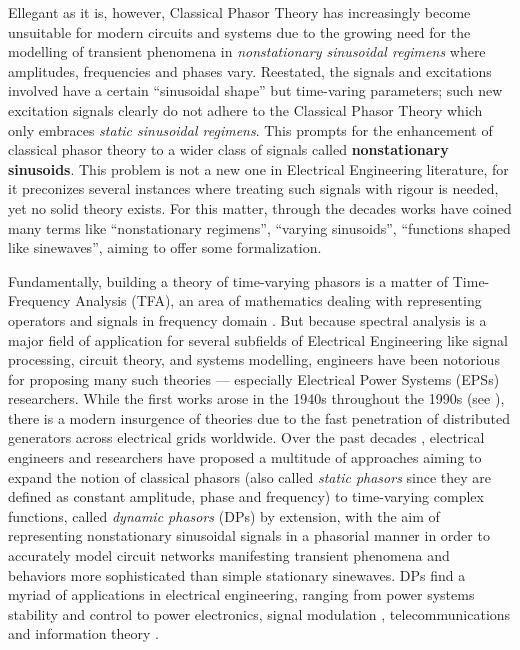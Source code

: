 	Ellegant as it is, however, Classical Phasor Theory has increasingly become unsuitable for modern circuits and systems due to the growing need for the modelling of transient phenomena in \textit{nonstationary sinusoidal regimens} where amplitudes, frequencies and phases vary. Reestated, the signals and excitations involved have a certain ``sinusoidal shape'' but time-varing parameters; such new excitation signals clearly do not adhere to the Classical Phasor Theory which only embraces \textit{static sinusoidal regimens}. This prompts for the enhancement of classical phasor theory to a wider class of signals called \textbf{nonstationary sinusoids}. This problem is not a new one in Electrical Engineering literature, for it preconizes several instances where treating such signals with rigour is needed, yet no solid theory exists. For this matter, through the decades works have coined many terms like ``nonstationary regimens'', ``varying sinusoids'', ``functions shaped like sinewaves'', aiming to offer some formalization.

	Fundamentally, building a theory of time-varying phasors is a matter of Time-Frequency Analysis (TFA), an area of mathematics dealing with representing operators and signals in frequency domain . But because spectral analysis is a major field of application for several subfields of Electrical Engineering like signal processing, circuit theory, and systems modelling, engineers have been notorious for proposing many such theories — especially Electrical Power Systems (EPSs) researchers. While the first works arose in the 1940s throughout the 1990s (see \cite{Venkatasubramanian1995a,Venkatasubramanian1995}), there is a modern insurgence of theories due to the fast penetration of distributed generators across electrical grids worldwide. Over the past decades , electrical engineers and researchers have proposed a multitude of approaches aiming to expand the notion of classical phasors (also called \textit{static phasors} since they are defined as constant amplitude, phase and frequency) to time-varying complex functions, called \textit{dynamic phasors} (DPs) by extension, with the aim of representing nonstationary sinusoidal signals in a phasorial manner in order to accurately model circuit networks manifesting transient phenomena and behaviors more sophisticated than simple stationary sinewaves. DPs find a myriad of applications in electrical engineering, ranging from power systems stability and control to power electronics, signal modulation , telecommunications  and information theory .

